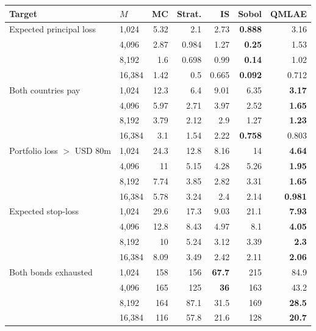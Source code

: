 \begin{tabular}{llrrrrr}\toprule Target & $M$ & MC & Strat. & IS & Sobol & QMLAE\\\midrule
Expected principal loss & 1,024 & 5.32 & 2.1 & 2.73 & \textbf{0.888} & 3.16\\
 & 4,096 & 2.87 & 0.984 & 1.27 & \textbf{0.25} & 1.53\\
 & 8,192 & 1.6 & 0.698 & 0.99 & \textbf{0.14} & 1.02\\
 & 16,384 & 1.42 & 0.5 & 0.665 & \textbf{0.092} & 0.712\\
\midrule
Both countries pay & 1,024 & 12.3 & 6.4 & 9.01 & 6.35 & \textbf{3.17}\\
 & 4,096 & 5.97 & 2.71 & 3.97 & 2.52 & \textbf{1.65}\\
 & 8,192 & 3.79 & 2.12 & 2.9 & 1.27 & \textbf{1.23}\\
 & 16,384 & 3.1 & 1.54 & 2.22 & \textbf{0.758} & 0.803\\
\midrule
Portfolio loss $>$ USD 80m & 1,024 & 24.3 & 12.8 & 8.16 & 14 & \textbf{4.64}\\
 & 4,096 & 11 & 5.15 & 4.28 & 5.26 & \textbf{1.95}\\
 & 8,192 & 7.74 & 3.85 & 2.82 & 3.31 & \textbf{1.65}\\
 & 16,384 & 5.78 & 3.24 & 2.4 & 2.14 & \textbf{0.981}\\
\midrule
Expected stop-loss & 1,024 & 29.6 & 17.3 & 9.03 & 21.1 & \textbf{7.93}\\
 & 4,096 & 12.8 & 8.43 & 4.97 & 8.1 & \textbf{4.05}\\
 & 8,192 & 10 & 5.24 & 3.12 & 3.39 & \textbf{2.3}\\
 & 16,384 & 8.09 & 3.49 & 2.42 & 2.11 & \textbf{2.06}\\
\midrule
Both bonds exhausted & 1,024 & 158 & 156 & \textbf{67.7} & 215 & 84.9\\
 & 4,096 & 165 & 125 & \textbf{36} & 163 & 43.2\\
 & 8,192 & 164 & 87.1 & 31.5 & 169 & \textbf{28.5}\\
 & 16,384 & 116 & 57.8 & 21.6 & 128 & \textbf{20.7}\\
\bottomrule\end{tabular}